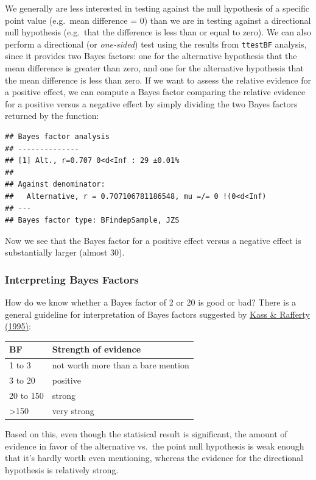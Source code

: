 \documentclass[
  12pt,
]{book}
\begin{document}
We generally are less interested in testing against the null hypothesis of a specific point value (e.g.~mean difference = 0) than we are in testing against a directional null hypothesis (e.g.~that the difference is less than or equal to zero). We can also perform a directional (or \emph{one-sided}) test using the results from \texttt{ttestBF} analysis, since it provides two Bayes factors: one for the alternative hypothesis that the mean difference is greater than zero, and one for the alternative hypothesis that the mean difference is less than zero. If we want to assess the relative evidence for a positive effect, we can compute a Bayes factor comparing the relative evidence for a positive versus a negative effect by simply dividing the two Bayes factors returned by the function:

\begin{verbatim}
## Bayes factor analysis
## --------------
## [1] Alt., r=0.707 0<d<Inf : 29 ±0.01%
## 
## Against denominator:
##   Alternative, r = 0.707106781186548, mu =/= 0 !(0<d<Inf) 
## ---
## Bayes factor type: BFindepSample, JZS
\end{verbatim}

Now we see that the Bayes factor for a positive effect versus a negative effect is substantially larger (almost 30).

\hypertarget{interpreting-bayes-factors}{%
\subsubsection{Interpreting Bayes Factors}\label{interpreting-bayes-factors}}

How do we know whether a Bayes factor of 2 or 20 is good or bad? There is a general guideline for interpretation of Bayes factors suggested by \href{https://www.andrew.cmu.edu/user/kk3n/simplicity/KassRaftery1995.pdf}{Kass \& Rafferty (1995)}:

\begin{longtable}[]{@{}ll@{}}
\toprule
BF & Strength of evidence \\
\midrule
\endhead
1 to 3 & not worth more than a bare mention \\
3 to 20 & positive \\
20 to 150 & strong \\
\textgreater150 & very strong \\
\bottomrule
\end{longtable}

Based on this, even though the statisical result is significant, the amount of evidence in favor of the alternative vs.~the point null hypothesis is weak enough that it's hardly worth even mentioning, whereas the evidence for the directional hypothesis is relatively strong.
\end{document}

